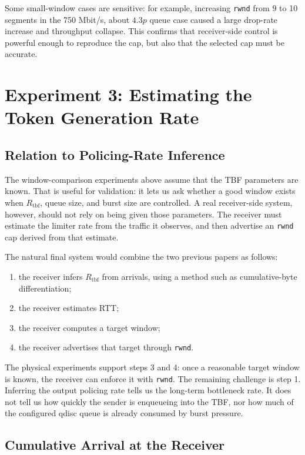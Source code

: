 \documentclass{article}
\newcommand{\code}[1]{\texttt{#1}}
\begin{document}
Some small-window cases are sensitive: for example, increasing \code{rwnd} from 9 to 10 segments in the 750 Mbit/s, 
about \(4.3p\) queue case caused a large drop-rate increase and throughput collapse. This confirms that receiver-side 
control is powerful enough to reproduce the cap, but also that the selected cap must be accurate.

\section{Experiment 3: Estimating the Token Generation Rate}

\subsection{Relation to Policing-Rate Inference}

The window-comparison experiments above assume that the TBF parameters are known. That is useful for validation: it 
lets us ask whether a good window exists when \(R_{\mathrm{tbf}}\), queue size, and burst size are controlled. A real 
receiver-side system, however, should not rely on being given those parameters. The receiver must estimate the limiter 
rate from the traffic it observes, and then advertise an \code{rwnd} cap derived from that estimate.

The natural final system would combine the two previous papers as follows:

\begin{enumerate}
  \item the receiver infers \(R_{\mathrm{tbf}}\) from arrivals, using a method such as cumulative-byte differentiation;
  \item the receiver estimates RTT;
  \item the receiver computes a target window;
  \item the receiver advertises that target through \code{rwnd}.
\end{enumerate}

The physical experiments support steps 3 and 4: once a reasonable target window is known, the receiver can enforce it 
with \code{rwnd}. The remaining challenge is step 1. Inferring the output policing rate tells us the long-term bottleneck 
rate. It does not tell us how quickly the sender is enqueueing into the TBF, nor how much of the configured qdisc queue 
is already consumed by burst pressure.

\subsection{Cumulative Arrival at the Receiver}
\end{document}
